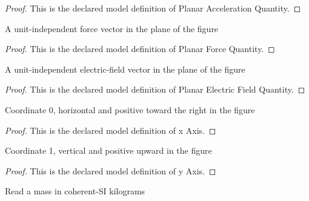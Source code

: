\begin{proof}
  This is the declared model definition of Planar Acceleration Quantity.
\end{proof}
\begin{definition}
  \label{def:physics:phyx-mini-0909:phyxminiproblems-problemphyxmini0909-planarforcequantity}
  A unit-independent force vector in the plane of the figure
\end{definition}
\begin{proof}
  This is the declared model definition of Planar Force Quantity.
\end{proof}
\begin{definition}
  \label{def:physics:phyx-mini-0909:phyxminiproblems-problemphyxmini0909-planarelectricfieldquantity}
  A unit-independent electric-field vector in the plane of the figure
\end{definition}
\begin{proof}
  This is the declared model definition of Planar Electric Field Quantity.
\end{proof}
\begin{definition}[x Axis]
  \label{def:physics:phyx-mini-0909:phyxminiproblems-problemphyxmini0909-xaxis}
  Coordinate 0, horizontal and positive toward the right in the figure
\end{definition}
\begin{proof}
  This is the declared model definition of x Axis.
\end{proof}
\begin{definition}[y Axis]
  \label{def:physics:phyx-mini-0909:phyxminiproblems-problemphyxmini0909-yaxis}
  Coordinate 1, vertical and positive upward in the figure
\end{definition}
\begin{proof}
  This is the declared model definition of y Axis.
\end{proof}
\begin{definition}
  \label{def:physics:phyx-mini-0909:phyxminiproblems-problemphyxmini0909-massinkilograms}
  Read a mass in coherent-SI kilograms
\end{definition}
